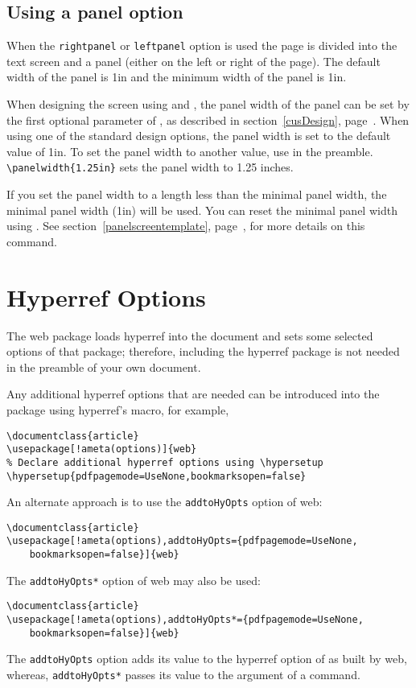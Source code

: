 \documentclass{article}
\let\pkg\textsf
\let\opt\texttt
\edef\amtIndent{\the\parindent}
\begin{document}
{\subsection{Using a panel option}

When the \texttt{rightpanel} or \texttt{leftpanel} option is used
the page is divided into the text screen and a panel (either on the
left or right of the page).  The default width of the panel is 1in
and the minimum width of the panel is 1in.

When designing the screen using  and ,
the panel width of the panel can be set by the first optional
parameter of , as described in
section~\ref{cusDesign}, page~\pageref*{cusDesign}. When using one
of the standard design options, the panel width is set to the
default value of 1in. To set the panel width to another value, use
 in the preamble. \verb!\panelwidth{1.25in}! sets the
panel width to 1.25 inches.

If you set the panel width to a length less than the minimal panel
width, the minimal panel width (1in) will be used. You can reset the
minimal panel width using . See
section~\ref{panelscreentemplate},
page~\pageref*{panelscreentemplate}, for more details on this command.

\section{Hyperref Options}

The \pkg{web} package loads \pkg{hyperref} into the document
and sets some selected options of that package;  therefore,
including the \pkg{hyperref} package is not needed in the
preamble of your own document.

Any additional \pkg{hyperref} options that are needed can be
introduced into the package using \pkg{hyperref}'s
 macro, for example,
\begin{Verbatim}[xleftmargin=\amtIndent,commandchars=!()]
\documentclass{article}
\usepackage[!ameta(options)]{web}
% Declare additional hyperref options using \hypersetup
\hypersetup{pdfpagemode=UseNone,bookmarksopen=false}
\end{Verbatim}
An alternate approach is to use the \opt{addtoHyOpts} option of \pkg{web}:
\begin{Verbatim}[xleftmargin=\amtIndent,commandchars=!()]
\documentclass{article}
\usepackage[!ameta(options),addtoHyOpts={pdfpagemode=UseNone,
    bookmarksopen=false}]{web}
\end{Verbatim}
The \opt{addtoHyOpts*} option of \pkg{web} may also be used:
\begin{Verbatim}[xleftmargin=\amtIndent,commandchars=!()]
\documentclass{article}
\usepackage[!ameta(options),addtoHyOpts*={pdfpagemode=UseNone,
    bookmarksopen=false}]{web}
\end{Verbatim}
The \opt{addtoHyOpts} option adds its value to the \pkg{hyperref} option of
as built by \pkg{web}, whereas, \opt{addtoHyOpts*} passes its value to the
argument of a  command.


}
\end{document}
